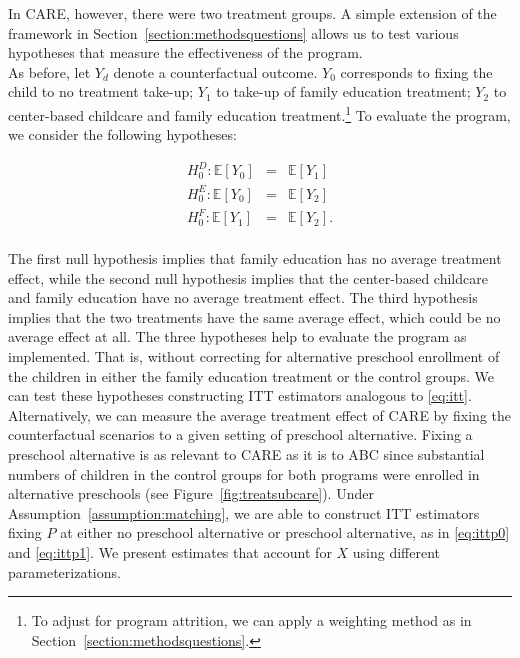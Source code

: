\noindent In CARE, however, there were two treatment groups. A simple extension of the framework in Section~\ref{section:methodsquestions} allows us to test various hypotheses that measure the effectiveness of the program.\\

\noindent As before, let $Y_{d}$ denote a counterfactual outcome. $Y_{0}$ corresponds to fixing the child to no treatment take-up;  $Y_{1}$ to take-up of family education treatment; $Y_{2}$ to center-based childcare and family education treatment.\footnote{To adjust for program attrition, we can apply a weighting method as in Section~\ref{section:methodsquestions}.} To evaluate the program, we consider the following hypotheses: 

\begin{eqnarray}
H_{0}^D: \mathbb{E} \left[ Y_{0} \right] &=&  \mathbb{E} \left[ Y_{1} \right] \\ 
H_{0}^E: \mathbb{E} \left[ Y_{0} \right] &=&  \mathbb{E} \left[ Y_{2} \right] \\
H_{0}^F: \mathbb{E} \left[ Y_{1} \right] &=&  \mathbb{E} \left[ Y_{2} \right]. 
\end{eqnarray}\\

\noindent The first null hypothesis implies that family education has no average treatment effect, while the second null hypothesis implies that the center-based childcare and family education have no average treatment effect. The third hypothesis implies that the two treatments have the same average effect, which could be no average effect at all. The three hypotheses help to evaluate the program as implemented. That is, without correcting for alternative preschool enrollment of the children in either the family education treatment or the control groups. We can test these hypotheses constructing ITT estimators analogous to \eqref{eq:itt}.\\ 

\noindent Alternatively, we can measure the average treatment effect of CARE by fixing the counterfactual scenarios to a given setting of preschool alternative. Fixing a preschool alternative is as relevant to CARE as it is to ABC since substantial numbers of children in the control groups for both programs were enrolled in alternative preschools (see Figure~\ref{fig:treatsubcare}). Under Assumption~\ref{assumption:matching}, we are able to construct ITT estimators fixing $P$ at either no preschool alternative or preschool alternative, as in \eqref{eq:ittp0} and \eqref{eq:ittp1}. We present estimates that account for $X$ using different parameterizations.\\


